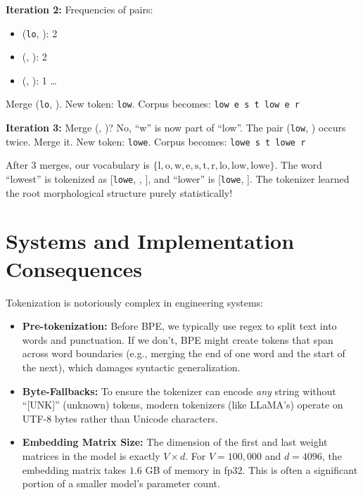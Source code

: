 \textbf{Iteration 2:}
Frequencies of pairs:
\begin{itemize}
    \item (\texttt{lo}, ): 2
    \item (, ): 2
    \item (, ): 1
    \dots
\end{itemize}
Merge (\texttt{lo}, ).
New token: \texttt{low}.
Corpus becomes: \texttt{low e s t low e r}

\textbf{Iteration 3:}
Merge (, )? No, ``w'' is now part of ``low''.
The pair (\texttt{low}, ) occurs twice. Merge it.
New token: \texttt{lowe}.
Corpus becomes: \texttt{lowe s t lowe r}

After 3 merges, our vocabulary is $\{\text{l}, \text{o}, \text{w}, \text{e}, \text{s}, \text{t}, \text{r}, \text{lo}, \text{low}, \text{lowe}\}$. The word ``lowest'' is tokenized as [\texttt{lowe}, , ], and ``lower'' is [\texttt{lowe}, ]. The tokenizer learned the root morphological structure purely statistically!

\section{Systems and Implementation Consequences}
\label{ch:07:sec:systems}

Tokenization is notoriously complex in engineering systems:
\begin{itemize}
    \item \textbf{Pre-tokenization:} Before BPE, we typically use regex to split text into words and punctuation. If we don't, BPE might create tokens that span across word boundaries (e.g., merging the end of one word and the start of the next), which damages syntactic generalization.
    \item \textbf{Byte-Fallbacks:} To ensure the tokenizer can encode \textit{any} string without ``[UNK]'' (unknown) tokens, modern tokenizers (like LLaMA's) operate on UTF-8 bytes rather than Unicode characters.
    \item \textbf{Embedding Matrix Size:} The dimension of the first and last weight matrices in the model is exactly $V \times d$. For $V=100,000$ and $d=4096$, the embedding matrix takes $1.6$ GB of memory in fp32. This is often a significant portion of a smaller model's parameter count.
\end{itemize}

